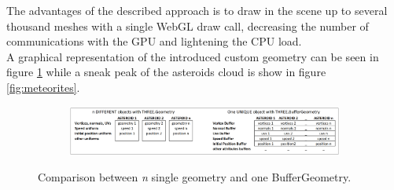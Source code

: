 \documentclass[paper=a4, fontsize=11pt]{scrartcl} %
\numberwithin{equation}{section} %
\numberwithin{figure}{section} %
\numberwithin{table}{section} %
\theoremstyle{definition}
\begin{document}
The advantages of the described approach is to draw in the scene up to several thousand meshes with a single WebGL draw call, decreasing the number of communications with the GPU and lightening the CPU load.\\
A graphical representation of the introduced custom geometry can be seen in figure \ref{fig:buffer_geometry} while a sneak peak of the asteroids cloud is show in figure \ref{fig:meteorites}.

\begin{figure}
	\centering
	\begin{subfigure}{\textwidth}
		\centering
		\includegraphics[width=1.0\linewidth]{images/asteroids_geometry.png}
	\end{subfigure}
	\caption{Comparison between \textit{n} single geometry and one BufferGeometry.}
	\label{fig:buffer_geometry}
\end{figure}
\end{document}
